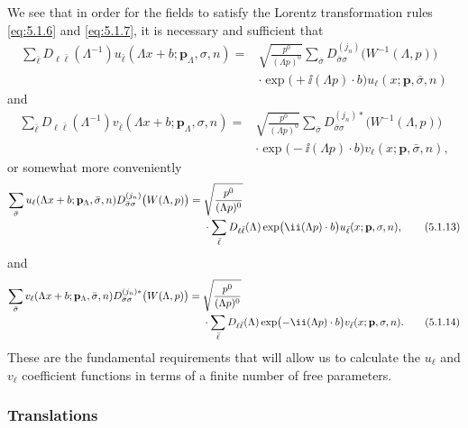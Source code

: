 We see that in order for the fields to satisfy the Lorentz transformation
rules \eqref{eq:5.1.6} and \eqref{eq:5.1.7}, it is necessary and sufficient that
\begin{align*}
  \sum_{\bar\ell}D_{\ell\bar\ell}(\Lambda^{-1})
  u_{\bar\ell}(\Lambda x+b;\mathbf{p}_\Lambda,\sigma,n)
  ={}&\sqrt{\frac{p^0}{(\Lambda p)^0}}
  \sum_{\bar\sigma}D^{(j_n)}_{\bar\sigma\sigma}
  \bigl(W^{-1}(\Lambda,p)\bigr)
  \\
  &\cdot\exp\bigl(+\ii(\Lambda p)\cdot b\bigr)
  u_\ell(x;\mathbf{p},\bar\sigma,n)
\end{align*}
and
\begin{align*}
  \sum_{\bar\ell}D_{\ell\bar\ell}(\Lambda^{-1})
  v_{\bar\ell}(\Lambda x+b;\mathbf{p}_\Lambda,\sigma,n)
  ={}&\sqrt{\frac{p^0}{(\Lambda p)^0}}
  \sum_{\bar\sigma}D^{(j_n)*}_{\bar\sigma\sigma}
  \bigl(W^{-1}(\Lambda,p)\bigr)
  \\
  &\cdot\exp\bigl(-\ii(\Lambda p)\cdot b\bigr)
  v_\ell(x;\mathbf{p},\bar\sigma,n),
\end{align*}
or somewhat more conveniently
\begin{align}
  \sum_{\bar\sigma}u_\ell(\Lambda x+b;\mathbf{p}_\Lambda,\bar\sigma,n)
  D^{(j_n)}_{\bar\sigma\sigma}\bigl(W(\Lambda,p)\bigr)
  ={}&\sqrt{\frac{p^0}{(\Lambda p)^0}}
  \notag\\[-2pt]
  &\cdot\sum_{\bar\ell}D_{\ell\bar\ell}(\Lambda)
  \exp\bigl(\ii(\Lambda p)\cdot b\bigr)
  u_{\bar\ell}(x;\mathbf{p},\sigma,n),
  \tag{5.1.13}\label{eq:5.1.13}
\end{align}
and
\begin{align}
  \sum_{\bar\sigma}v_\ell(\Lambda x+b;\mathbf{p}_\Lambda,\bar\sigma,n)
  D^{(j_n)*}_{\bar\sigma\sigma}\bigl(W(\Lambda,p)\bigr)
  ={}&\sqrt{\frac{p^0}{(\Lambda p)^0}}
  \notag\\[-2pt]
  &\cdot\sum_{\bar\ell}D_{\ell\bar\ell}(\Lambda)
  \exp\bigl(-\ii(\Lambda p)\cdot b\bigr)
  v_{\bar\ell}(x;\mathbf{p},\sigma,n).
  \tag{5.1.14}\label{eq:5.1.14}
\end{align}
These are the fundamental requirements that will allow us to calculate the
$u_\ell$ and $v_\ell$ coefficient functions in terms of a finite number of
free parameters.

\subsubsection*{Translations}

